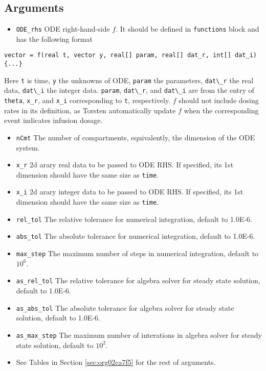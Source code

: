 \documentclass[12pt, reqno, oneside]{amsbook}
\numberwithin{equation}{chapter}
\numberwithin{figure}{chapter}
\numberwithin{table}{chapter}
\theoremstyle{remark}
\begin{document}
\subsection{Arguments}
\label{sec:org605fb37}
\begin{itemize}
\item \texttt{ODE\_rhs}
ODE right-hand-side \(f\). It should be defined in
\texttt{functions} block and has the following format
\end{itemize}
\begin{verbatim}
vector = f(real t, vector y, real[] param, real[] dat_r, int[] dat_i) {...}
\end{verbatim}
Here \texttt{t} is time, \texttt{y} the unknowns of ODE, \texttt{param} the parameters, \texttt{dat\textbackslash{}\_r} the real data, \texttt{dat\textbackslash{}\_i}
the integer data. \texttt{param},
\texttt{dat\textbackslash{}\_r}, and \texttt{dat\textbackslash{}\_i} are from
the entry of \texttt{theta}, \texttt{x\_r},
and \texttt{x\_i} corresponding to
\texttt{t}, respectively.
\(f\) should not include dosing rates in its
definition, as Torsten automatically update \(f\)
when the corresponding event indicates infusion dosage.
\begin{itemize}
\item \texttt{nCmt}
The number of compartments, equivalently, the dimension of the ODE system.
\item \texttt{x\_r}
2d arary real data to be passed to ODE RHS. If specified, its 1st
dimension should have the same size as \texttt{time}.
\item \texttt{x\_i}
2d arary integer data to be passed to ODE RHS. If specified, its 1st
dimension should have the same size as \texttt{time}.
\item \texttt{rel\_tol}
The relative tolerance for numerical integration, default to 1.0E-6.
\item \texttt{abs\_tol}
The absolute tolerance for numerical integration, default to 1.0E-6.
\item \texttt{max\_step}
The maximum number of steps in numerical integration, default to \(10^6\).
\item \texttt{as\_rel\_tol}
The relative tolerance for algebra solver for steady state solution, default to 1.0E-6.
\item \texttt{as\_abs\_tol}
The absolute tolerance for algebra solver for steady state solution, default to 1.0E-6.
\item \texttt{as\_max\_step}
The maximum number of interations in algebra solver for steady state solution, default to \(10^2\).
\item See Tables in Section \ref{sec:org02ca7f5} for the rest of arguments.
\end{itemize}
\end{document}
